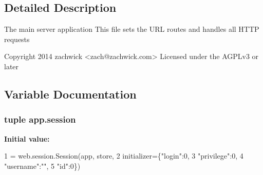 \subsection{Detailed Description}
\begin{DoxyVerb}The main server application
This file sets the URL routes and handles all HTTP requests

Copyright 2014 zachwick <zach@zachwick.com>
Licensed under the AGPLv3 or later\end{DoxyVerb}
 

\subsection{Variable Documentation}
\hypertarget{namespaceapp_acfce2e9f97f56c1bbe2b384796d8194a}{
\subsubsection[{session}]{\setlength{\rightskip}{0pt plus 5cm}tuple app.\+session}}\label{namespaceapp_acfce2e9f97f56c1bbe2b384796d8194a}
{\bfseries Initial value\+:}
\begin{DoxyCode}
1 = web.session.Session(app, store,
2                               initializer=\{\textcolor{stringliteral}{"login"}:0, 
3                                            \textcolor{stringliteral}{"privilege"}:0,
4                                            \textcolor{stringliteral}{"username"}:\textcolor{stringliteral}{""},
5                                            \textcolor{stringliteral}{"id"}:0\})
\end{DoxyCode}
